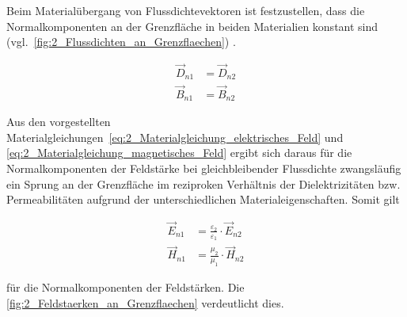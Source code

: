 Beim Materialübergang von Flussdichtevektoren ist festzustellen, dass die Normalkomponenten an der Grenzfläche in beiden Materialien konstant sind (vgl.~\Abb \ref{fig:2_Flussdichten_an_Grenzflaechen}) \cite{EM_Schirmung}.  

\begin{subequations}
\begin{align}
    \vec D_{n1} &= \vec D_{n2} \label{subeq:2_Flussdichtennormale1} \\
    \vec B_{n1} &= \vec B_{n2} \label{subeq:2_Flussdichtennormale2}
\end{align}
\label{eq:2_Flussdichtennormale}
\end{subequations}


Aus den vorgestellten Materialgleichungen~\ref{eq:2_Materialgleichung_elektrisches_Feld} und \ref{eq:2_Materialgleichung_magnetisches_Feld} ergibt sich daraus für die Normalkomponenten der Feldstärke bei gleichbleibender Flussdichte zwangsläufig ein Sprung an der Grenzfläche im reziproken Verhältnis der Dielektrizitäten bzw. Permeabilitäten aufgrund der unterschiedlichen Materialeigenschaften. Somit gilt

\begin{subequations}
\begin{align}
    \vec E_{n1} &= \frac{\varepsilon_2}{\varepsilon_1} \cdot \vec E_{n2} \label{subeq:2_Feldstaerkenormale1} \\
    \vec H_{n1} &= \frac{\mu_2}{\mu_1} \cdot \vec H_{n2} \label{subeq:2_Feldstaerkenormale2}
\end{align}
\label{eq:2_Feldstaerkenormale}
\end{subequations}

für die Normalkomponenten der Feldstärken. Die \Abb \ref{fig:2_Feldstaerken_an_Grenzflaechen} verdeutlicht dies. 

